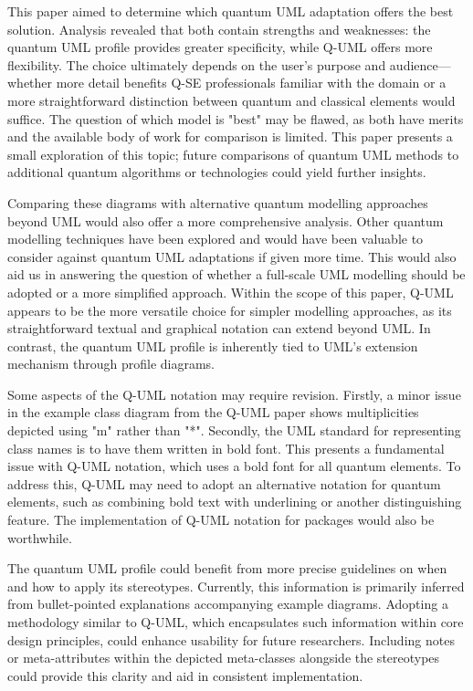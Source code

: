 \documentclass{article}
\begin{document}
This paper aimed to determine which quantum UML adaptation offers the best solution. Analysis revealed that both contain strengths and weaknesses: the quantum UML profile provides greater specificity, while Q-UML offers more flexibility. The choice ultimately depends on the user's purpose and audience—whether more detail benefits Q-SE professionals familiar with the domain or a more straightforward distinction between quantum and classical elements would suffice. The question of which model is "best" may be flawed, as both have merits and the available body of work for comparison is limited. This paper presents a small exploration of this topic; future comparisons of quantum UML methods to additional quantum algorithms or technologies could yield further insights. 

Comparing these diagrams with alternative quantum modelling approaches beyond UML would also offer a more comprehensive analysis. Other quantum modelling techniques have been explored and would have been valuable to consider against quantum UML adaptations if given more time\cite{9233151}\cite{app132111794}. This would also aid us in answering the question of whether a full-scale UML modelling should be adopted or a more simplified approach. Within the scope of this paper, Q-UML appears to be the more versatile choice for simpler modelling approaches, as its straightforward textual and graphical notation can extend beyond UML. In contrast, the quantum UML profile is inherently tied to UML's extension mechanism through profile diagrams. 

Some aspects of the Q-UML notation may require revision. Firstly, a minor issue in the example class diagram from the Q-UML paper shows multiplicities depicted using "m" rather than "*". Secondly, the UML standard for representing class names is to have them written in bold font\cite{Seidl_Scholz_Huemer_Kappel_Duffy_2014}. This presents a fundamental issue with Q-UML notation, which uses a bold font for all quantum elements. To address this, Q-UML may need to adopt an alternative notation for quantum elements, such as combining bold text with underlining or another distinguishing feature. The implementation of Q-UML notation for packages would also be worthwhile. 

The quantum UML profile could benefit from more precise guidelines on when and how to apply its stereotypes. Currently, this information is primarily inferred from bullet-pointed explanations accompanying example diagrams. Adopting a methodology similar to Q-UML, which encapsulates such information within core design principles, could enhance usability for future researchers. Including notes or meta-attributes within the depicted meta-classes alongside the stereotypes could provide this clarity and aid in consistent implementation.
\end{document}
